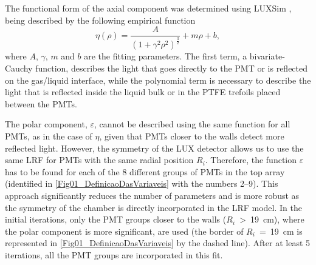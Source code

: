 \documentclass[a4paper,11pt]{article}
\begin{document}
The functional form of the axial component was  determined using LUXSim \cite{LUX2012_LUXSim}, being described by the following empirical function
\begin{equation}
 \eta\left(\rho\right) = \frac{A}{\left(1+\gamma^2 \rho^2\right)^{\frac{3}{2}}} + m\rho+b,
\label{eq_radial_component}
\end{equation}
where $A$, $\gamma$, $m$ and $b$ are the fitting parameters. The first term, a bivariate-Cauchy function, describes the light that goes directly to the PMT or is reflected on the gas/liquid interface, while the polynomial term is necessary to describe the light that is reflected inside the liquid bulk or in the PTFE trefoils placed between the PMTs. 

The polar component, $\varepsilon$, cannot be described using the same function for all PMTs, as in the case of $\eta$, given that PMTs closer to the walls detect more reflected light. However, the symmetry of the LUX detector allows us to use the same LRF for PMTs with the same radial position $R_i$. Therefore, the function $\varepsilon$ has to be found for each of the 8 different groups of PMTs in the top array (identified in \cref{Fig01_DefinicaoDasVariaveis} with the numbers 2--9). This approach significantly reduces the number of parameters and is more robust as the symmetry of the chamber is directly incorporated in the LRF model. In the initial iterations, only the PMT groups closer to the walls ($R_i$~>~19~cm), where the polar component is more significant, are used (the border of $R_i$~=~19~cm is represented in \cref{Fig01_DefinicaoDasVariaveis} by the dashed line). After at least 5 iterations, all the PMT groups are incorporated in this fit. 
\end{document}
